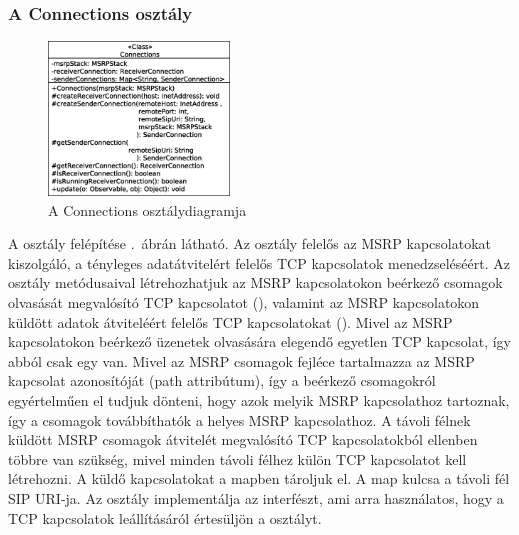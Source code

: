 \newpage
\subsubsection*{A Connections osztály}
\label{sec:msrp_connections}

\begin{figure}
  \vspace{-15pt}
  \begin{center}
    \includegraphics[width=0.43\textwidth]{img/class_diagrams/Connections.eps}
  \end{center}
  \vspace{-15pt}
  \captionsetup{font=scriptsize}
  \caption{A Connections osztálydiagramja}
   \label{fig:class_connections}
  \vspace{-10pt}
\end{figure}
A  osztály felépítése .~ábrán látható. Az osztály felelős az MSRP kapcsolatokat kiszolgáló, a tényleges adatátvitelért felelős TCP kapcsolatok menedzseléséért. Az osztály metódusaival létrehozhatjuk az MSRP kapcsolatokon beérkező csomagok olvasását megvalósító TCP kapcsolatot (), valamint az MSRP kapcsolatokon küldött adatok átviteléért felelős TCP kapcsolatokat (). Mivel az MSRP kapcsolatokon beérkező üzenetek olvasására elegendő egyetlen TCP kapcsolat, így abból csak egy van. Mivel az MSRP csomagok fejléce tartalmazza az MSRP kapcsolat azonosítóját (path attribútum), így a beérkező csomagokról egyértelműen el tudjuk dönteni, hogy azok melyik MSRP kapcsolathoz tartoznak, így a csomagok továbbíthatók a helyes MSRP kapcsolathoz. A távoli félnek küldött MSRP csomagok átvitelét megvalósító TCP kapcsolatokból ellenben többre van szükség, mivel minden távoli félhez külön TCP kapcsolatot kell létrehozni. A küldő kapcsolatokat a  mapben tároljuk el. A map kulcsa a távoli fél SIP URI-ja. Az osztály implementálja az  interfészt, ami arra használatos, hogy a TCP kapcsolatok leállításáról értesüljön a  osztályt.

